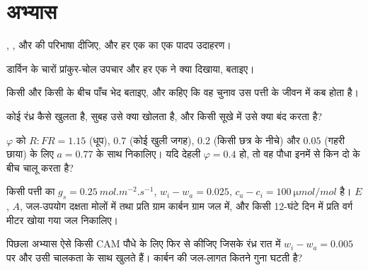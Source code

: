 \section{अभ्यास}

\begin{exercise}[$\star$]\label{exo:b2:plant-plasticity:1}
, ,  और
 की परिभाषा दीजिए, और हर एक का एक पादप उदाहरण।
\end{exercise}

\begin{exercise}[$\star$]\label{exo:b2:plant-plasticity:2}
डार्विन के चारों प्रांकुर-चोल उपचार और हर एक ने क्या दिखाया, बताइए।
\end{exercise}

\begin{exercise}[$\star$]\label{exo:b2:plant-plasticity:3}
किसी  और किसी  के बीच पाँच भेद बताइए, और कहिए
कि वह चुनाव उस पत्ती के जीवन में कब होता है।
\end{exercise}

\begin{exercise}[$\star$]\label{exo:b2:plant-plasticity:4}
कोई रंध्र कैसे खुलता है, सुबह उसे क्या खोलता है, और किसी सूखे में उसे
क्या बंद करता है?
\end{exercise}

\begin{exercise}[$\star\star$]\label{exo:b2:plant-plasticity:5}
$\varphi$ को $R{:}FR = 1.15$ (धूप), $0.7$ (कोई खुली जगह), $0.2$ (किसी
छत्र के नीचे) और $0.05$ (गहरी छाया) के लिए $a = 0.77$ के साथ निकालिए। यदि
देहली $\varphi = 0.4$ हो, तो वह पौधा इनमें से किन दो के बीच
 चालू करता है?
\end{exercise}

\begin{exercise}[$\star\star$]\label{exo:b2:plant-plasticity:6}
किसी पत्ती का $g_s = \qty{0.25}{mol.m^{-2}.s^{-1}}$, $w_i - w_a = 0.025$,
$c_a - c_i = \qty{100}{\micro mol/mol}$ है। $E$, $A$,
जल-उपयोग दक्षता मोलों में तथा प्रति ग्राम कार्बन ग्राम जल में, और
किसी 12-घंटे दिन में प्रति वर्ग मीटर खोया गया जल निकालिए।
\end{exercise}

\begin{exercise}[$\star\star$]\label{exo:b2:plant-plasticity:7}
पिछला अभ्यास ऐसे किसी CAM पौधे के लिए फिर से कीजिए जिसके रंध्र
रात में $w_i - w_a = 0.005$ पर और उसी चालकता के साथ खुलते हैं। कार्बन
की जल-लागत कितने गुना घटती है?
\end{exercise}

